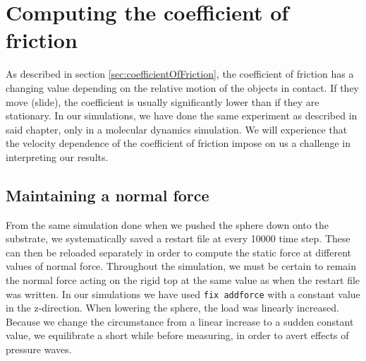 \documentclass[twoside,english]{uiofysmaster}
\begin{document}
\chapter{Computing the coefficient of friction}
As described in section \ref{sec:coefficientOfFriction}, the coefficient of friction has a changing value depending on the relative motion of the objects in contact. 
If they move (slide), the coefficient is usually significantly lower than if they are stationary. 
In our simulations, we have done the same experiment as described in said chapter, only in a molecular dynamics simulation. 
We will experience that the velocity dependence of the coefficient of friction impose on us a challenge in interpreting our results.

\section{Maintaining a normal force}
From the same simulation done when we pushed the sphere down onto the substrate, we systematically saved a restart file at every 10000 time step.
These can then be reloaded separately in order to compute the static force at different values of normal force.
Throughout the simulation, we must be certain to remain the normal force acting on the rigid top at the same value as when the restart file was written.
In our simulations we have used \texttt{fix addforce} with a constant value in the z-direction.
When lowering the sphere, the load was linearly increased. 
Because we change the circumstance from a linear increase to a sudden constant value, we equilibrate a short while before measuring, in order to avert effects of pressure waves.
\end{document}
